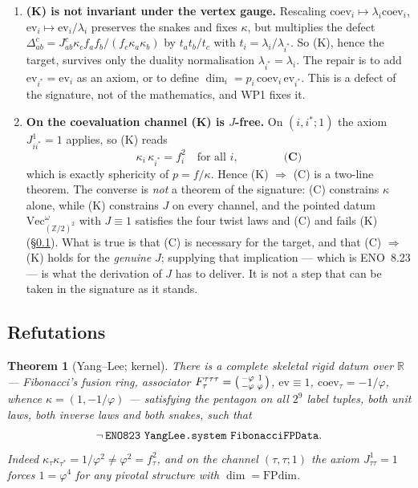 \documentclass[11pt,a4paper]{article}
\newtheorem{theorem}{Theorem}[section]
\theoremstyle{remark}
\newcommand{\code}[1]{\texttt{\detokenize{#1}}}
\newcommand{\FPdim}{\mathrm{FPdim}}
\newcommand{\Vect}{\mathrm{Vec}}
\newcommand{\R}{\mathbb{R}}
\newcommand{\Z}{\mathbb{Z}}
\begin{document}
\begin{enumerate}[label=(\roman*)]
\item \textbf{(K) is not invariant under the vertex gauge.} Rescaling
$\mathrm{coev}_i \mapsto \lambda_i \mathrm{coev}_i$, $\mathrm{ev}_i \mapsto
\mathrm{ev}_i/\lambda_i$ preserves the snakes and fixes $\kappa$, but multiplies the defect
$\Delta^{c}_{ab} = J^{c}_{ab}\kappa_c f_a f_b/(f_c \kappa_a \kappa_b)$ by $t_a t_b/t_c$ with
$t_i = \lambda_i/\lambda_{i^*}$. So (K), hence the target, survives only the duality
normalisation $\lambda_{i^*} = \lambda_i$. The repair is to add $\mathrm{ev}_{i^*} =
\mathrm{ev}_i$ as an axiom, or to define $\dim_i = p_i\,\mathrm{coev}_i\,\mathrm{ev}_{i^*}$.
This is a defect of the signature, not of the mathematics, and WP1 fixes it.
\item \textbf{On the coevaluation channel (K) is $J$-free.} On $(i,i^*;1)$ the axiom
$J^{1}_{ii^*} = 1$ applies, so (K) reads
\begin{equation}\label{eq:C}
\kappa_i\,\kappa_{i^*} = f_i^{2} \quad \text{for all } i, \qquad\qquad \textbf{(C)}
\end{equation}
which is exactly sphericity of $p = f/\kappa$. Hence (K) $\Rightarrow$ (C) is a two-line
theorem. The converse is \emph{not} a theorem of the signature: (C) constrains $\kappa$ alone,
while (K) constrains $J$ on every channel, and the pointed datum
$\Vect^{\omega}_{(\Z/2)^2}$ with $J \equiv 1$ satisfies the four twist laws and (C) and fails
(K) (\S\ref{sec:refute}). What is true is that (C) is necessary for the target, and that
(C) $\Rightarrow$ (K) holds for the \emph{genuine} $J$; supplying that implication --- which is
ENO~8.23 --- is what the derivation of $J$ has to deliver. It is not a step that can be taken in
the signature as it stands.
\end{enumerate}

\subsection{Refutations}\label{sec:refute}

\begin{theorem}[Yang--Lee; kernel]\label{thm:yanglee}
There is a complete skeletal rigid datum \code{YangLee.system} over $\R$ ---
Fibonacci's fusion ring, associator $F^{\tau\tau\tau}_{\tau} =
\begin{psmallmatrix} -\varphi & 1 \\ -\varphi & \varphi\end{psmallmatrix}$, $\mathrm{ev} \equiv 1$,
$\mathrm{coev}_\tau = -1/\varphi$, whence $\kappa = (1, -1/\varphi)$ --- satisfying the pentagon
on all $2^9$ label tuples, both unit laws, both inverse laws and both snakes, such that
\[
\neg\,\code{ENO823}\ \code{YangLee.system}\ \code{FibonacciFPData}.
\]
Indeed $\kappa_\tau\kappa_{\tau^*} = 1/\varphi^2 \neq \varphi^2 = f_\tau^2$, and on the channel
$(\tau,\tau;1)$ the axiom $J^{1}_{\tau\tau} = 1$ forces $1 = \varphi^4$ for any pivotal
structure with $\dim = \FPdim$.
\end{theorem}
\end{document}
